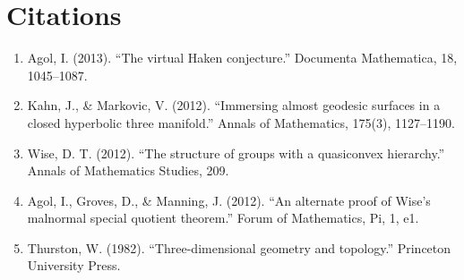 \section{Citations}

\begin{enumerate}
\item Agol, I. (2013). ``The virtual Haken conjecture.'' Documenta Mathematica, 18, 1045--1087.
\item Kahn, J., \& Markovic, V. (2012). ``Immersing almost geodesic surfaces in a closed hyperbolic three manifold.'' Annals of Mathematics, 175(3), 1127--1190.
\item Wise, D. T. (2012). ``The structure of groups with a quasiconvex hierarchy.'' Annals of Mathematics Studies, 209.
\item Agol, I., Groves, D., \& Manning, J. (2012). ``An alternate proof of Wise's malnormal special quotient theorem.'' Forum of Mathematics, Pi, 1, e1.
\item Thurston, W. (1982). ``Three-dimensional geometry and topology.'' Princeton University Press.
\end{enumerate}

